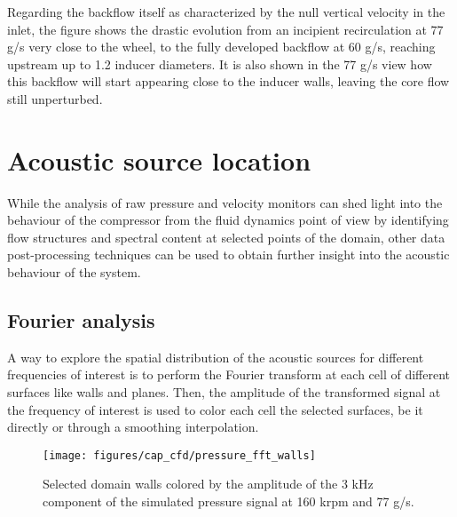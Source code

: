 Regarding the backflow itself as characterized by the null vertical velocity in the inlet, the figure shows the drastic evolution from an incipient recirculation at 77 g/s very close to the wheel, to the fully developed backflow at 60 g/s, reaching upstream up to 1.2 inducer diameters. It is also shown in the 77 g/s view how this backflow will start appearing close to the inducer walls, leaving  the core flow still unperturbed.


\section{Acoustic source location}

While the analysis of raw pressure and velocity monitors can shed light into the behaviour of the compressor from the fluid dynamics point of view by identifying flow structures and spectral content at selected points of the domain, other data post-processing techniques can be used to obtain further insight into the acoustic behaviour of the system.   

\subsection{Fourier analysis}

A way to explore the spatial distribution of the acoustic sources for different frequencies of interest is to perform the Fourier transform at each cell of different surfaces like walls and planes. Then, the amplitude of the transformed signal at the frequency of interest is used to color each cell the selected surfaces, be it directly or through a smoothing interpolation.

\begin{figure}[htb!]
\hspace{-0.01\textwidth}
\texttt{[image: figures/cap\_cfd/pressure\_fft\_walls]}
\caption{Selected domain walls colored by the amplitude of the 3 kHz component of the simulated pressure signal at 160 krpm and 77 g/s.}
\label{fig:pressure_fft_walls}
\end{figure}

